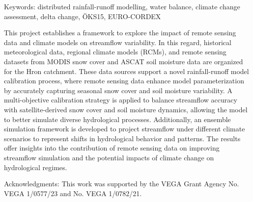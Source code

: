 Keywords: distributed rainfall-runoff modelling, water balance, climate change assessment, delta change, ÖKS15, EURO-CORDEX
\newpage{}
{}
\begin{flushleft}





\end{flushleft}

\noindent

This project establishes a framework to explore the impact of remote
sensing data and climate models on streamflow variability. In this
regard, historical meteorological data, regional climate models
(RCMs), and remote sensing datasets from MODIS snow cover and ASCAT
soil moisture data are organized for the Hron catchment. These data
sources support a novel rainfall-runoff model calibration process,
where remote sensing data enhance model parameterization by accurately
capturing seasonal snow cover and soil moisture variability. A
multi-objective calibration strategy is applied to balance streamflow
accuracy with satellite-derived snow cover and soil moisture dynamics,
allowing the model to better simulate diverse hydrological
processes. Additionally, an ensemble simulation framework is developed
to project streamflow under different climate scenarios to represent
shifts in hydrological behavior and patterns. The results offer
insights into the contribution of remote sensing data on improving
streamflow simulation and the potential impacts of climate change on
hydrological regimes.

Acknowledgments: This work was supported by the VEGA Grant Agency No. VEGA
1/0577/23 and No. VEGA 1/0782/21.

